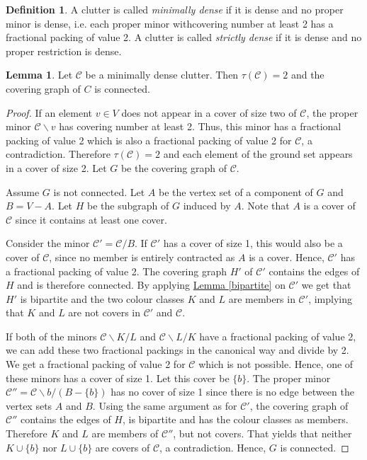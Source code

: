 \documentclass[a4paper, 12pt, twoside=false]{scrbook}
\theoremstyle{definition}
\newtheorem*{definition}{Definition}
\newtheorem{lemma}[theorem]{Lemma}
\begin{document}
   \begin{definition}
       A clutter is called \emph{minimally dense} if it is dense and no proper minor is dense, i.e. each proper minor withcovering number at least 2 has a fractional packing of value 2.
       A clutter is called \emph{strictly dense} if it is dense and no proper restriction is dense.
   \end{definition}
   \begin{lemma}\label{connectivity}
       Let $\mathcal{C}$ be a minimally dense clutter.
       Then $\tau(\mathcal{C})=2$ and the covering graph of $C$ is connected.
   \end{lemma}

   \begin{proof}
       If an element $v \in V$ does not appear in a cover of size two of $\mathcal{C}$, the proper minor $\mathcal{C} \backslash v$ has covering number at least 2.
       Thus, this minor has a fractional packing of value 2 which is also a fractional packing of value 2 for $\mathcal{C}$, a contradiction.
       Therefore $\tau(\mathcal{C}) = 2$ and each element of the ground set appears in a cover of size 2.
       Let $G$ be the covering graph of $\mathcal{C}$.

       Assume $G$ is not connected.
       Let $A$ be the vertex set of a component of $G$ and $B = V - A$.
       Let $H$ be the subgraph of $G$ induced by $A$.
       Note that $A$ is a cover of $\mathcal{C}$ since it contains at least one cover.

       Consider the minor $\mathcal{C'}=\mathcal{C}/B$.
       If $\mathcal{C'}$ has a cover of size 1, this would also be a cover of $\mathcal{C}$, since no member is entirely contracted as $A$ is a cover.
       Hence, $\mathcal{C'}$ has a fractional packing of value 2.
       The covering graph $H'$ of $\mathcal{C'}$ contains the edges of $H$ and is therefore connected.
       By applying \hyperref[bipartite]{Lemma \ref*{bipartite}} on $\mathcal{C'}$ we get that $H'$ is bipartite and the two colour classes $K$ and $L$ are members in $\mathcal{C'}$, implying that $K$ and $L$ are not covers in $\mathcal{C'}$ and $\mathcal{C}$.

       If both of the minors $\mathcal{C} \backslash K / L$ and $\mathcal{C} \backslash L / K$ have a fractional packing of value 2, we can add these two fractional packings in the canonical way and divide by 2.
       We get a fractional packing of value 2 for $\mathcal{C}$ which is not possible.
       Hence, one of these minors has a cover of size 1.
       Let this cover be $\{b\}$.
       The proper minor $\mathcal{C''}=\mathcal{C} \backslash b / (B-\{b\})$ has no cover of size 1 since there is no edge between the vertex sets $A$ and $B$.
       Using the same argument as for $\mathcal{C'}$, the covering graph of $\mathcal{C''}$ contains the edges of $H$, is bipartite and has the colour classes as members.
       Therefore $K$ and $L$ are members of $\mathcal{C''}$, but not covers.
       That yields that neither $K \cup \{b\}$ nor $L \cup \{b\}$ are covers of $\mathcal{C}$, a contradiction.
       Hence, $G$ is connected.
   \end{proof}
\end{document}
